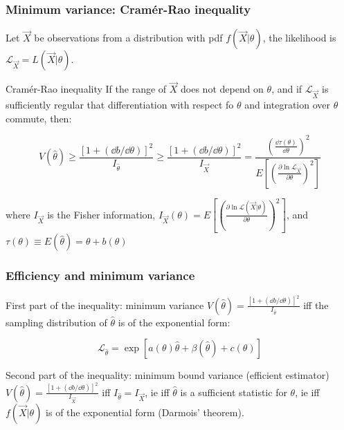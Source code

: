 \documentclass[9pt]{beamer}
\begin{document}
\begin{frame}
 \frametitle{Minimum variance: Cramér-Rao inequality}
 
 Let $\vec{X}$ be observations from a distribution with pdf $f(\vec{X}|\theta)$, the likelihood is $\mathcal{L}_{\vec{X}} = L(\vec{X}|\theta)$.
 
 \begin{block}{Cramér-Rao inequality}
 If the range of $\vec{X}$ does not depend on $\theta$, and if $\mathcal{L}_{\vec{X}}$ is sufficiently regular that differentiation with respect fo $\theta$ and integration over 
 $\theta$ commute, then:
 
  $$V(\hat{\theta}) \geq \frac{[1+(\dd b / \dd \theta)]^2}{I_{\hat{\theta}}} 
  \geq \frac{[1+(\dd b / \dd \theta)]^2}{I_{\vec{X}}} 
  = \frac{\left( \frac{\dd \tau(\theta)}{\dd \theta} \right)^2}{E\left[ \left( \frac{\partial \ln \mathcal{L}_{\vec{X}}}{\partial \theta} \right)^2 \right]}$$
  
  where $I_{\vec{X}}$ is the Fisher information, $I_{\vec{X}}(\theta) = E\left[ \left( \frac{\partial \ln \mathcal{L}(\vec{X}|\theta)}{\partial \theta} \right)^2 \right]$, and 
  $\tau(\theta) \equiv E(\hat{\theta}) = \theta + b(\theta)$
 \end{block}

\end{frame}

\begin{frame}
 \frametitle{Efficiency and minimum variance}
 
 \begin{block}{First part of the inequality: minimum variance}
  $V(\hat{\theta}) = \frac{[1+(\dd b / \dd \theta)]^2}{I_{\hat{\theta}}} $ iff the sampling distribution of $\hat{\theta}$ is of the exponential form:
  
  $$\mathcal{L}_{\hat{\theta}} = \exp [a(\theta)\hat{\theta} + \beta(\hat{\theta}) + c(\theta)]$$
 \end{block}
 
 \begin{block}{Second part of the inequality: minimum bound variance (efficient estimator)}
  $V(\hat{\theta}) = \frac{[1+(\dd b / \dd \theta)]^2}{I_{\vec{X}}} $ iff $ I_{\hat{\theta}} = I_{\vec{X}} $, ie iff $\hat{\theta}$ is a sufficient statistic for $\theta$, ie
  iff $f(\vec{X}|\theta)$ is of the exponential form (Darmois' theorem).
 \end{block}


\end{frame}
\end{document}
